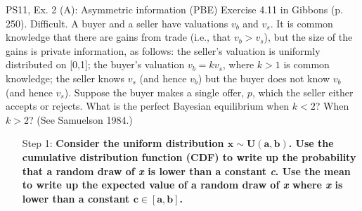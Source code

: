 \begin{frame}{PS11, Ex. 2 (A): Asymmetric information (PBE)}
    Exercise 4.11 in Gibbons (p. 250). Difficult. A buyer and a seller have valuations $v_b$ and $v_s$. It is common knowledge that there are gains from trade (i.e., that $v_b > v_s$), but the size of the gains is private information, as follows: the seller’s valuation is uniformly distributed on [0,1]; the buyer’s valuation $v_b = kv_s$, where $k > 1$ is common knowledge; the seller knows $v_s$ (and hence $v_b$) but the buyer does not know $v_b$ (and hence $v_s$). Suppose the buyer makes a single offer, $p$, which the seller either accepts or rejects. What is the perfect Bayesian equilibrium when $k < 2$? When $k > 2$? (See Samuelson 1984.) \vspace{-8pt}
    \begin{multicols}{2}
      \begin{itemize}
        \item[Step 1:] \textbf{Consider the uniform distribution $\bm{x\sim U(a, b)}$. Use the cumulative distribution function (CDF) to write up the probability that a random draw of \textit{x} is lower than a constant \textit{c}. Use the mean to write up the expected value of a random draw of \textit{x} where \textit{x} is lower than a constant $\bm{c\in[a,b]}$.}
      \end{itemize}
      \vfill\null\columnbreak
      \vfill\null
    \end{multicols}
\end{frame}
